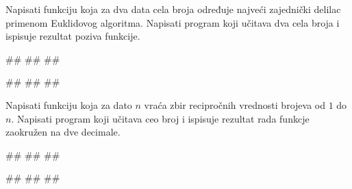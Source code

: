 \begin{Exercise}[label=v1.4_03] 
Napisati funkciju  koja za dva data
cela broja određuje najveći zajednički delilac primenom Euklidovog
algoritma. Napisati program koji učitava dva cela broja i ispisuje
rezultat poziva funkcije.

\begin{miditest}
\begin{upotreba}{1}
#\naslovInt#
##
##
\end{upotreba}
\end{miditest}
\begin{miditest}
\begin{upotreba}{2}
#\naslovInt#
##
##
\end{upotreba}
\end{miditest}


\end{Exercise}
\begin{Answer}[ref=v1.4_03]
\end{Answer}

\begin{Exercise}[label=v1.4_04] 
Napisati funkciju  koja za dato
$n$ vraća zbir recipročnih vrednosti brojeva od $1$ do $n$. Napisati
program koji učitava ceo broj i ispisuje rezultat rada funkcje
zaokružen na dve decimale.

\begin{miditest}
\begin{upotreba}{1}
#\naslovInt#
##
##
\end{upotreba}
\end{miditest}
\begin{miditest}
\begin{upotreba}{2}
#\naslovInt#
##
##
\end{upotreba}
\end{miditest}

\end{Exercise}
\begin{Answer}[ref=v1.4_04]
\end{Answer}


